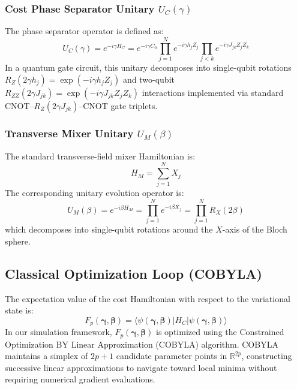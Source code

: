 \documentclass[11pt,a4paper]{article}
\theoremstyle{definition}
\theoremstyle{remark}
\begin{document}
\subsubsection{Cost Phase Separator Unitary $U_C(\gamma)$}
The phase separator operator is defined as:
\begin{equation}
U_C(\gamma) = e^{-i \gamma H_C} = e^{-i \gamma C_0} \prod_{j=1}^N e^{-i \gamma h_j Z_j} \prod_{j < k} e^{-i \gamma J_{jk} Z_j Z_k}
\end{equation}
In a quantum gate circuit, this unitary decomposes into single-qubit rotations $R_Z(2 \gamma h_j) = \exp(-i \gamma h_j Z_j)$ and two-qubit $R_{ZZ}(2 \gamma J_{jk}) = \exp(-i \gamma J_{jk} Z_j Z_k)$ interactions implemented via standard CNOT--$R_Z(2 \gamma J_{jk})$--CNOT gate triplets.

\subsubsection{Transverse Mixer Unitary $U_M(\beta)$}
The standard transverse-field mixer Hamiltonian is:
\begin{equation}
H_M = \sum_{j=1}^N X_j
\end{equation}
The corresponding unitary evolution operator is:
\begin{equation}
U_M(\beta) = e^{-i \beta H_M} = \prod_{j=1}^N e^{-i \beta X_j} = \prod_{j=1}^N R_X(2 \beta)
\end{equation}
which decomposes into single-qubit rotations around the $X$-axis of the Bloch sphere.

\subsection{Classical Optimization Loop (COBYLA)}
The expectation value of the cost Hamiltonian with respect to the variational state is:
\begin{equation}
F_p(\boldsymbol{\gamma}, \boldsymbol{\beta}) = \langle \psi(\boldsymbol{\gamma}, \boldsymbol{\beta}) | H_C | \psi(\boldsymbol{\gamma}, \boldsymbol{\beta}) \rangle
\end{equation}
In our simulation framework, $F_p(\boldsymbol{\gamma}, \boldsymbol{\beta})$ is optimized using the Constrained Optimization BY Linear Approximation (COBYLA) algorithm. COBYLA maintains a simplex of $2p + 1$ candidate parameter points in $\mathbb{R}^{2p}$, constructing successive linear approximations to navigate toward local minima without requiring numerical gradient evaluations.
\end{document}
